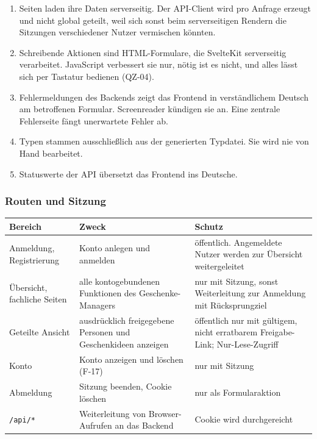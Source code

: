 \documentclass[11pt,a4paper]{article}
\begin{document}
\begin{enumerate}
\item Seiten laden ihre Daten serverseitig. Der API-Client wird pro Anfrage erzeugt und nicht global geteilt, weil sich sonst beim serverseitigen Rendern die Sitzungen verschiedener Nutzer vermischen könnten.
\item Schreibende Aktionen sind HTML-Formulare, die SvelteKit serverseitig verarbeitet. JavaScript verbessert sie nur, nötig ist es nicht, und alles lässt sich per Tastatur bedienen (QZ-04).
\item Fehlermeldungen des Backends zeigt das Frontend in verständlichem Deutsch am betroffenen Formular. Screenreader kündigen sie an. Eine zentrale Fehlerseite fängt unerwartete Fehler ab.
\item Typen stammen ausschließlich aus der generierten Typdatei. Sie wird nie von Hand bearbeitet.
\item Statuswerte der API übersetzt das Frontend ins Deutsche.
\end{enumerate}


\subsubsection{Routen und Sitzung}

\begin{tabularx}{\linewidth}{@{}>{\hsize=0.68\hsize\RaggedRight\arraybackslash}X >{\hsize=1.14\hsize\RaggedRight\arraybackslash}X >{\hsize=1.18\hsize\RaggedRight\arraybackslash}X@{}}
\toprule
\textbf{Bereich} & \textbf{Zweck} & \textbf{Schutz} \\
\midrule
\endhead
Anmeldung, Registrierung & Konto anlegen und anmelden & öffentlich. Angemeldete Nutzer werden zur Übersicht weitergeleitet \\
Übersicht, fachliche Seiten & alle kontogebundenen Funktionen des Geschenke-Managers & nur mit Sitzung, sonst Weiterleitung zur Anmeldung mit Rücksprungziel \\
Geteilte Ansicht & ausdrücklich freigegebene Personen und Geschenkideen anzeigen & öffentlich nur mit gültigem, nicht erratbarem Freigabe-Link; Nur-Lese-Zugriff \\
Konto & Konto anzeigen und löschen (F-17) & nur mit Sitzung \\
Abmeldung & Sitzung beenden, Cookie löschen & nur als Formularaktion \\
\texttt{/\allowbreak{}api/\allowbreak{}*} & Weiterleitung von Browser-Aufrufen an das Backend & Cookie wird durchgereicht \\
\bottomrule
\end{tabularx}
\end{document}
